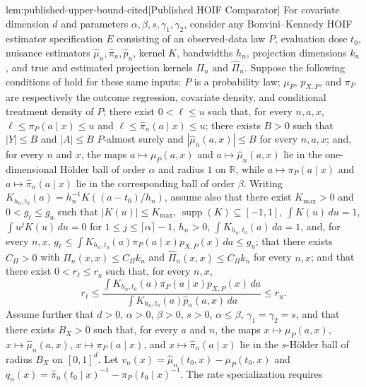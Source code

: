\documentclass[11pt]{article}
\begin{document}
\begin{citedv}{lem:published-upper-bound-cited}[Published HOIF Comparator]
For covariate dimension \(d\) and parameters \(\alpha,\beta,s,\gamma_1,\gamma_2\), consider any Bonvini--Kennedy HOIF estimator specification \(E\) consisting of an observed-data law \(P\), evaluation dose \(t_0\), nuisance estimators \(\hat\mu_n,\hat\pi_n,\hat p_n\), kernel \(K\), bandwidths \(h_n\), projection dimensions \(k_n\), and true and estimated projection kernels \(\Pi_n\) and \(\widehat\Pi_n\). Suppose the following conditions of \citet[Theorem~3.1 and \S3.4]{bonvini2022} hold for these same inputs: \(P\) is a probability law; \(\mu_P\), \(p_{X,P}\), and \(\pi_P\) are respectively the outcome regression, covariate density, and conditional treatment density of \(P\); there exist \(0<\ell\le u\) such that, for every \(n,a,x\), \(\ell\le\pi_P(a\mid x)\le u\) and \(\ell\le\hat\pi_n(a\mid x)\le u\); there exists \(B>0\) such that \(|Y|\le B\) and \(|A|\le B\) \(P\)-almost surely and \(|\hat\mu_n(a,x)|\le B\) for every \(n,a,x\); and, for every \(n\) and \(x\), the maps \(a\mapsto\mu_P(a,x)\) and \(a\mapsto\hat\mu_n(a,x)\) lie in the one-dimensional Hölder ball of order \(\alpha\) and radius \(1\) on \(\mathbb R\), while \(a\mapsto\pi_P(a\mid x)\) and \(a\mapsto\hat\pi_n(a\mid x)\) lie in the corresponding ball of order \(\beta\). Writing \(K_{h_n,t_0}(a)=h_n^{-1}K((a-t_0)/h_n)\), assume also that there exist \(K_{\max}>0\) and \(0<g_{\ell}\le g_u\) such that \(|K(u)|\le K_{\max}\), \(\operatorname{supp}(K)\subseteq[-1,1]\), \(\int K(u)\,du=1\), \(\int u^jK(u)\,du=0\) for \(1\le j\le\lceil\alpha\rceil-1\), \(h_n>0\), \(\int K_{h_n,t_0}(a)\,da=1\), and, for every \(n,x\), \(g_{\ell}\le\int K_{h_n,t_0}(a)\pi_P(a\mid x)p_{X,P}(x)\,da\le g_u\); that there exists \(C_\Pi>0\) with \(\Pi_n(x,x)\le C_\Pi k_n\) and \(\widehat\Pi_n(x,x)\le C_\Pi k_n\) for every \(n,x\); and that there exist \(0<r_{\ell}\le r_u\) such that, for every \(n,x\),
\[
r_{\ell}\le
\frac{\int K_{h_n,t_0}(a)\pi_P(a\mid x)p_{X,P}(x)\,da}
{\int K_{h_n,t_0}(a)\hat p_n(a,x)\,da}
\le r_u .
\]
Assume further that \(d>0\), \(\alpha>0\), \(\beta>0\), \(s>0\), \(\alpha\le\beta\), \(\gamma_1=\gamma_2=s\), and that there exists \(B_X>0\) such that, for every \(a\) and \(n\), the maps \(x\mapsto\mu_P(a,x)\), \(x\mapsto\hat\mu_n(a,x)\), \(x\mapsto\pi_P(a\mid x)\), and \(x\mapsto\hat\pi_n(a\mid x)\) lie in the \(s\)-Hölder ball of radius \(B_X\) on \([0,1]^d\). Let \(v_n(x)=\hat\mu_n(t_0,x)-\mu_P(t_0,x)\) and \(q_n(x)=\hat\pi_n(t_0\mid x)^{-1}-\pi_P(t_0\mid x)^{-1}\). The rate specialization requires

\end{citedv}
\end{document}
